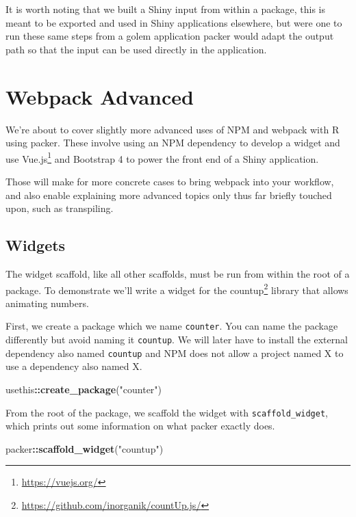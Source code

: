 \documentclass[10pt,]{krantz}
\makeatletter
\newenvironment{Shaded}{\begin{snugshade}}{\end{snugshade}}
\newcommand{\KeywordTok}[1]{\textcolor[rgb]{0.27,0.27,0.27}{\textbf{#1}}}
\newcommand{\NormalTok}[1]{#1}
\newcommand{\OperatorTok}[1]{\textcolor[rgb]{0.43,0.43,0.43}{\textbf{#1}}}
\newcommand{\StringTok}[1]{\textcolor[rgb]{0.5,0.5,0.5}{#1}}
\renewcommand{\href}[2]{#2\footnote{\url{#1}}}
\newenvironment{kframe}{%
\medskip{}
\setlength{\fboxsep}{.8em}
 \def\at@end@of@kframe{}%
 \ifinner\ifhmode%
  \def\at@end@of@kframe{\end{minipage}}%
  \begin{minipage}{\columnwidth}%
 \fi\fi%
 \def\FrameCommand##1{\hskip\@totalleftmargin \hskip-\fboxsep
 \colorbox{shadecolor}{##1}\hskip-\fboxsep
     \hskip-\linewidth \hskip-\@totalleftmargin \hskip\columnwidth}%
 \MakeFramed {\advance\hsize-\width
   \@totalleftmargin\z@ \linewidth\hsize
   \@setminipage}}%
 {\par\unskip\endMakeFramed%
 \at@end@of@kframe}
\renewenvironment{Shaded}{\begin{kframe}}{\end{kframe}}
\makeatother
\begin{document}
It is worth noting that we built a Shiny input from within a package, this is meant to be exported and used in Shiny applications elsewhere, but were one to run these same steps from a golem application packer would adapt the output path so that the input can be used directly in the application.

\hypertarget{packer-adv}{%
\chapter{Webpack Advanced}\label{packer-adv}}

We're about to cover slightly more advanced uses of NPM and webpack with R using packer. These involve using an NPM dependency to develop a widget and use \href{https://vuejs.org/}{Vue.js} and Bootstrap 4 to power the front end of a Shiny application.

Those will make for more concrete cases to bring webpack into your workflow, and also enable explaining more advanced topics only thus far briefly touched upon, such as transpiling.

\hypertarget{packer-adv-widgets}{%
\section{Widgets}\label{packer-adv-widgets}}

The widget scaffold, like all other scaffolds, must be run from within the root of a package. To demonstrate we'll write a widget for the \href{https://github.com/inorganik/countUp.js/}{countup} library that allows animating numbers.

First, we create a package which we name \texttt{counter}. You can name the package differently but avoid naming it \texttt{countup}. We will later have to install the external dependency also named \texttt{countup} and NPM does not allow a project named X to use a dependency also named X.

\begin{Shaded}
\begin{Highlighting}[]
\NormalTok{usethis}\OperatorTok{::}\KeywordTok{create_package}\NormalTok{(}\StringTok{"counter"}\NormalTok{)}
\end{Highlighting}
\end{Shaded}

From the root of the package, we scaffold the widget with \texttt{scaffold\_widget}, which prints out some information on what packer exactly does.

\begin{Shaded}
\begin{Highlighting}[]
\NormalTok{packer}\OperatorTok{::}\KeywordTok{scaffold_widget}\NormalTok{(}\StringTok{"countup"}\NormalTok{)}
\end{Highlighting}
\end{Shaded}
\end{document}
